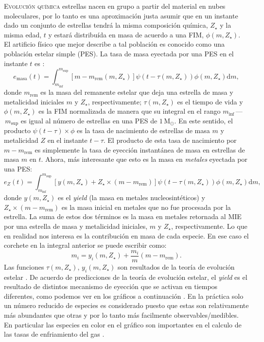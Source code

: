 \documentclass[xcolor=dvipsnames,4pt,hyperref={colorlinks,citecolor=black,linkcolor=black,urlcolor=black}]{beamer}
\begin{document}
\begin{frame}[allowframebreaks]{\textsc{Evolución química}}
estrellas nacen en grupo a partir del material en nubes moleculares, por lo tanto es una
aproximación justa asumir que en un instante dado un conjunto de estrellas tendrá la misma
composición química, $Z_\star$ y la misma edad, $t$ y estará distribuída en masa de acuerdo a una
FIM, $\phi(m,Z_\star)$. El artificio físico que mejor describe a tal población es conocido como una
población estelar simple (PES). La tasa de masa eyectada por una PES en el instante $t$ es
\citep{Yates2013}:
%
$$
e_\text{masa}(t) = \int_{m_\text{inf}}^{m_\text{sup}}\left[m-m_\text{rem}(m,Z_\star)\right]\psi(t-\tau(m,Z_\star))\phi(m,Z_\star)\text{d}m,
$$
%
donde $m_\text{rem}$ es la masa del remanente estelar que deja una estrella de masa y metalicidad
iniciales $m$ y $Z_\star$, respectivamente; $\tau(m,Z_\star)$ es el tiempo de vida y
$\phi(m,Z_\star)$ es la FIM normalizada de manera que su integral en el rango
$m_\text{inf}\,$---$\,m_\text{sup}$ es igual al número de estrellas en una PES de $1\,$M$_\odot$. En
este sentido, el producto $\psi(t-\tau)\times\phi$ es la tasa de nacimiento de estrellas de masa $m$
y metalicidad $Z$ en el instante $t-\tau$. El producto de esta tasa de nacimiento por
$m-m_\text{rem}$ es simplemente la tasa de eyección instantánea de masa en estrellas de masa $m$ en
$t$. Ahora, más interesante que esto es la masa en \emph{metales} eyectada por una PES:
%
$$
e_Z(t) = \int_{m_\text{inf}}^{m_\text{sup}}\left[y(m,Z_\star)+Z_\star\times(m-m_\text{rem})\right]\psi(t-\tau(m,Z_\star))\phi(m,Z_\star)\text{d}m,
$$
%
donde $y(m,Z_\star)$ es el \emph{yield} (la masa en metales nucleosintéticos) y
$Z_\star\times(m-m_\text{rem})$ es la masa inicial en metales que no fue procesada por la estrella.
La suma de estos dos términos es la masa en metales retornada al MIE por una estrella de masa y
metalicidad iniciales, $m$ y $Z_\star$, respectivamente. Lo que en realidad nos interesa es la
contribución en masa de cada especie. En ese caso el corchete en la integral anterior se puede
escribir como:
%
$$
m_i = y_i(m,Z_\star) + \frac{m_i}{m}(m-m_\text{rem}).
$$
%
Las funciones $\tau(m,Z_\star)$, $y_i(m,Z_\star)$ son resultados de la teoría de evolución estelar
\citep[e.\,g.][]{Portinari1998, Marigo2001}.
De acuerdo de predicciones de la teoría de evolución estelar, el \emph{yield} es el resultado de
distintos mecanismo de eyección que se activan en tiempos diferentes, como podemos ver en los
gráficos a continuación \citep{Yates2013}.
En la práctica solo un número reducido de especies es considerado puesto que estas son relativamente
más abundantes que otras y por lo tanto más facilmente observables/medibles. En particular las
especies en color en el gráfico son importantes en el calculo de las tasas de enfriamiento del gas
\citep{Wiersma2009a}.
%
\end{frame}
\end{document}
